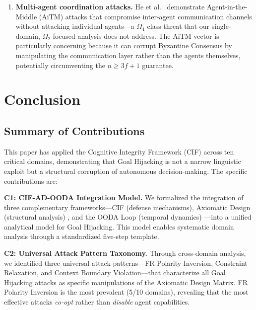 \documentclass[
]{article}
\begin{document}
\begin{enumerate}
  rates on real MCP server deployments, suggesting that the boundary
  between tool integration and data ingestion may itself constitute a
  novel adversary class between \(\Omega_2\) and \(\Omega_3\).
\item
  \textbf{Multi-agent coordination attacks.} He et
  al.~\cite{he2025redteaming} demonstrate Agent-in-the-Middle (AiTM)
  attacks that compromise inter-agent communication channels without
  attacking individual agents---a \(\Omega_4\) class threat that our
  single-domain, \(\Omega_2\)-focused analysis does not address. The
  AiTM vector is particularly concerning because it can corrupt
  Byzantine Consensus by manipulating the communication layer rather
  than the agents themselves, potentially circumventing the
  \(n \geq 3f+1\) guarantee.
\end{enumerate}

\newpage

\section{Conclusion}\label{conclusion}

\subsection{Summary of Contributions}\label{summary-of-contributions}

This paper has applied the Cognitive Integrity Framework (CIF)
\cite{friedman2026cogsec1} across ten critical domains, demonstrating
that Goal Hijacking is not a narrow linguistic exploit but a structural
corruption of autonomous decision-making. The specific contributions
are:

\textbf{C1: CIF-AD-OODA Integration Model.} We formalized the
integration of three complementary frameworks---CIF (defense
mechanisms), Axiomatic Design (structural analysis)
\cite{suh2001axiomatic}, and the OODA Loop (temporal dynamics)
\cite{boyd1987patterns}---into a unified analytical model for Goal
Hijacking. This model enables systematic domain analysis through a
standardized five-step template.

\textbf{C2: Universal Attack Pattern Taxonomy.} Through cross-domain
analysis, we identified three universal attack patterns---FR Polarity
Inversion, Constraint Relaxation, and Context Boundary Violation---that
characterize all Goal Hijacking attacks as specific manipulations of the
Axiomatic Design Matrix. FR Polarity Inversion is the most prevalent
(5/10 domains), revealing that the most effective attacks \emph{co-opt}
rather than \emph{disable} agent capabilities.
\end{document}

